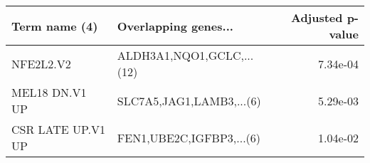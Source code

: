 \begin{tabular}{llr}
\toprule
    Term name (4) &      Overlapping genes... &  Adjusted p-value \\
\midrule
        NFE2L2.V2 & ALDH3A1,NQO1,GCLC,...(12) &          7.34e-04 \\
   MEL18 DN.V1 UP &  SLC7A5,JAG1,LAMB3,...(6) &          5.29e-03 \\
CSR LATE UP.V1 UP &  FEN1,UBE2C,IGFBP3,...(6) &          1.04e-02 \\
\bottomrule
\end{tabular}
